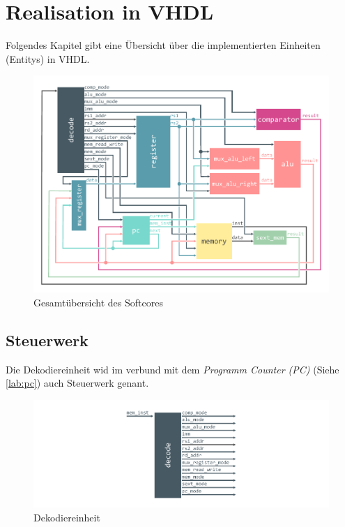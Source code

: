 \chapter{Realisation in VHDL}

    Folgendes Kapitel gibt eine Übersicht über die implementierten Einheiten (Entitys) in VHDL.
    \begin{figure}[H]
        \centering
        \includegraphics[scale=1]{img/OverviewCPU.pdf}
        \caption{Gesamtübersicht des Softcores}
        \label{fig:cpu_overview}
    \end{figure}


    \section{Steuerwerk}



        Die Dekodiereinheit wid im verbund mit dem \textit{Programm Counter (PC)} (Siehe \ref{lab:pc}) auch Steuerwerk genant.

        \begin{figure}[H]
            \centering
            \includegraphics[scale=1]{img/block_decode.pdf}
            \caption{Dekodiereinheit}
            \label{fig:decode}
        \end{figure}

